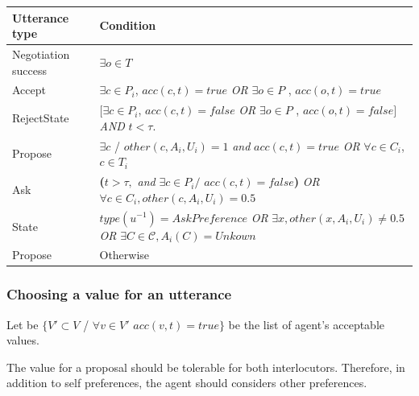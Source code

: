 \documentclass{llncs}
\begin{document}
	\begin{tabular}{|p{3cm}|p{9cm}|}
		\hline
		\textbf{Utterance type} & Condition \\
		\hline
		Negotiation success &  $\exists o \in T$ \\
		\hline
		Accept & $\exists c \in P_i$, $acc(c, t)=true $ \newline \emph{OR}   \newline $ \exists o \in P$ ,  $acc(o, t) =true$ \\
		\hline
		RejectState & $ [\exists c \in P_i$, $acc(c, t)= false $  \emph{OR}   $ \exists o \in P$ ,  $acc(o, t)=false]$ \newline  \emph{AND} $t<\tau$.\\
		\hline
		Propose & $\exists c$ / $other(c, A_i, U_i)  = 1 $  \emph{and}
		\newline $acc(c, t)=true$
		\newline \emph{OR}  
		\newline $\forall c \in C_i$,  $c \in T_i$\\
		\hline
		Ask &  \textbf{(}$t> \tau,$ \emph{and} 
		$\exists c \in P_i /$
		$ acc(c, t)=false$\textbf{) }
		\newline \emph{OR}
		\newline $ \forall c \in C_i,other(c, A_i, U_i)=0.5$ \\
		\hline
		
		State & $type(u^{-1}) = AskPreference$
		\newline \emph{OR}
		\newline $\exists x,other(x, A_i, U_i) \not = 0.5 $ 
		\newline \emph{OR}
		\newline $ \exists C \in \mathcal{C}, A_i(C) = Unkown$
		\\
		\hline
		Propose & Otherwise \\
		\hline
	\end{tabular}
	
	
	\subsubsection{Choosing a value for an utterance} 
	
	
	Let be $\{V' \subset V$ / $\forall v \in V'$ $ acc(v,t) = true\}$ be the list of agent's acceptable values. 
	
	The value for a proposal should be tolerable for both interlocutors. Therefore,  in addition to self preferences, the agent should considers other preferences. 
	
\end{document}
